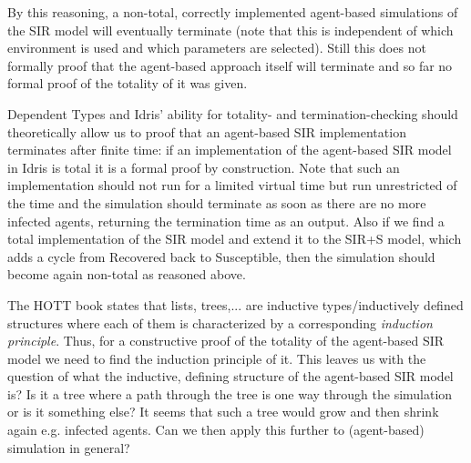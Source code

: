 By this reasoning, a non-total, correctly implemented agent-based simulations of the SIR model will eventually terminate (note that this is independent of which environment is used and which parameters are selected). Still this does not formally proof that the agent-based approach itself will terminate and so far no formal proof of the totality of it was given.

Dependent Types and Idris' ability for totality- and termination-checking should theoretically allow us to proof that an agent-based SIR implementation terminates after finite time: if an implementation of the agent-based SIR model in Idris is total it is a formal proof by construction. Note that such an implementation should not run for a limited virtual time but run unrestricted of the time and the simulation should terminate as soon as there are no more infected agents, returning the termination time as an output. Also if we find a total implementation of the SIR model and extend it to the SIR+S model, which adds a cycle from Recovered back to Susceptible, then the simulation should become again non-total as reasoned above.

The HOTT book \cite{program_homotopy_2013} states that lists, trees,... are inductive types/inductively defined structures where each of them is characterized by a corresponding \textit{induction principle}. Thus, for a constructive proof of the totality of the agent-based SIR model we need to find the induction principle of it. This leaves us with the question of what the inductive, defining structure of the agent-based SIR model is? Is it a tree where a path through the tree is one way through the simulation or is it something else? It seems that such a tree would grow and then shrink again e.g. infected agents. Can we then apply this further to (agent-based) simulation in general?


%
%

